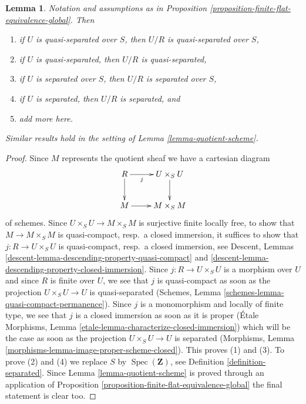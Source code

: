 \documentclass{stacks-project}
\theoremstyle{plain}
\newtheorem{lemma}[subsection]{Lemma}
\theoremstyle{definition}
\theoremstyle{remark}
\numberwithin{equation}{subsection}
\def\Spec{\mathop{\mathrm{Spec}}}
\begin{document}
\begin{lemma}
\label{lemma-quotient-separated}
Notation and assumptions as in
Proposition \ref{proposition-finite-flat-equivalence-global}. Then
\begin{enumerate}
\item if $U$ is quasi-separated over $S$, then $U/R$ is quasi-separated
over $S$,
\item if $U$ is quasi-separated, then $U/R$ is quasi-separated,
\item if $U$ is separated over $S$, then $U/R$ is separated over $S$,
\item if $U$ is separated, then $U/R$ is separated, and
\item add more here.
\end{enumerate}
Similar results hold in the setting of Lemma \ref{lemma-quotient-scheme}.
\end{lemma}

\begin{proof}
Since $M$ represents the quotient sheaf we have a cartesian diagram
$$
\xymatrix{
R \ar[r]_-j \ar[d] & U \times_S U \ar[d] \\
M \ar[r] & M \times_S M
}
$$
of schemes. Since $U \times_S U \to M \times_S M$ is surjective finite locally
free, to show that $M \to M \times_S M$ is quasi-compact, resp.\ a closed
immersion, it suffices to show that $j : R \to U \times_S U$ is
quasi-compact, resp.\ a closed immersion, see
Descent, Lemmas \ref{descent-lemma-descending-property-quasi-compact} and
\ref{descent-lemma-descending-property-closed-immersion}.
Since $j : R \to U \times_S U$ is a morphism over $U$ and since
$R$ is finite over $U$, we see that $j$ is quasi-compact as soon
as the projection $U \times_S U \to U$ is quasi-separated
(Schemes, Lemma \ref{schemes-lemma-quasi-compact-permanence}).
Since $j$ is a monomorphism and locally of finite type, we see that
$j$ is a closed immersion as soon as it is proper
(\'Etale Morphisms, Lemma \ref{etale-lemma-characterize-closed-immersion})
which will be the case as soon as the projection
$U \times_S U \to U$ is separated
(Morphisms, Lemma \ref{morphisms-lemma-image-proper-scheme-closed}).
This proves (1) and (3). To prove (2) and (4) we replace $S$ by
$\Spec(\mathbf{Z})$, see Definition \ref{definition-separated}.
Since Lemma \ref{lemma-quotient-scheme} is proved through an application of
Proposition \ref{proposition-finite-flat-equivalence-global}
the final statement is clear too.
\end{proof}
\end{document}
